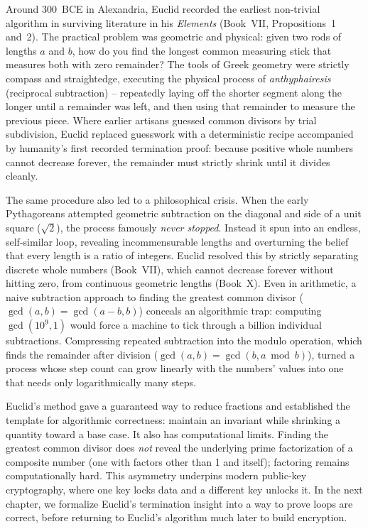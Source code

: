\begin{historybox}
Around 300~BCE in Alexandria, Euclid recorded the earliest non-trivial algorithm in surviving
literature in his \emph{Elements} (Book~VII, Propositions~1 and~2). The practical problem was
geometric and physical: given two rods of lengths $a$ and $b$, how do you find the longest common
measuring stick that measures both with zero remainder? The tools of Greek geometry were strictly
compass and straightedge, executing the physical process of \emph{anthyphairesis} (reciprocal
subtraction) -- repeatedly laying off the shorter segment along the longer until a remainder was
left, and then using that remainder to measure the previous piece. Where earlier artisans guessed
common divisors by trial subdivision, Euclid replaced guesswork with a deterministic recipe
accompanied by humanity's first recorded termination proof: because positive whole numbers cannot
decrease forever, the remainder must strictly shrink until it divides cleanly.

The same procedure also led to a philosophical crisis. When the early Pythagoreans
attempted geometric subtraction on the diagonal and side of a unit square ($\sqrt{2}$), the process
famously \emph{never stopped}. Instead it spun into an endless, self-similar loop, revealing
incommensurable lengths and overturning the belief that every length is a ratio of
integers. Euclid resolved this by strictly separating discrete whole numbers (Book~VII), which cannot
decrease forever without hitting zero, from continuous geometric lengths (Book~X). Even in arithmetic, a naive
subtraction approach to finding the greatest common divisor ($\gcd(a, b) = \gcd(a-b, b)$) conceals an algorithmic trap: computing
$\gcd(10^9, 1)$ would force a machine to tick through a billion individual subtractions. Compressing
repeated subtraction into the modulo operation, which finds the remainder after division ($\gcd(a, b) = \gcd(b, a \bmod b)$), turned a process
whose step count can grow linearly with the numbers' values into one that needs only logarithmically
many steps.

Euclid's method gave a guaranteed way to reduce fractions and established the template for
algorithmic correctness: maintain an invariant while shrinking a quantity toward a base case. It also
has computational limits. Finding the greatest common divisor does \emph{not} reveal the
underlying prime factorization of a composite number (one with factors other than 1 and itself); factoring remains computationally hard. This
asymmetry underpins modern public-key cryptography, where one key locks data and a different key unlocks it. In the next chapter, we formalize Euclid's termination
insight into a way to prove loops are correct, before returning to Euclid's
algorithm much later to build encryption.
\end{historybox}

